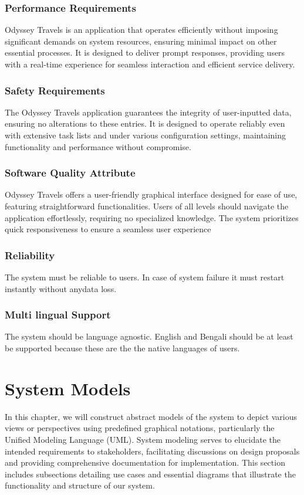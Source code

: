 \documentclass{scrreprt}
\begin{document}
\subsection{Performance Requirements}
Odyssey Travels is an application that operates efficiently without imposing significant demands on system resources, ensuring minimal impact on other essential processes. It is designed to deliver prompt responses, providing users with a real-time experience for seamless interaction and efficient service delivery.

\subsection {Safety Requirements}
The Odyssey Travels application guarantees the integrity of user-inputted data, ensuring no alterations to these entries. It is designed to operate reliably even with extensive task lists and under various configuration settings, maintaining functionality and performance without compromise.

\subsection {Software Quality Attribute}
Odyssey Travels offers a user-friendly graphical interface designed for ease of use, featuring straightforward functionalities. Users of all levels should navigate the application effortlessly, requiring no specialized knowledge. The system prioritizes quick responsiveness to ensure a seamless user experience
\subsection {Reliability}
The system must be reliable to users. In case of system failure it must restart instantly without anydata loss.
\subsection {Multi lingual Support}
The system should be language agnostic. English and Bengali should be at least be supported
because these are the the native languages of users.



\chapter{System Models}
In this chapter, we will construct abstract models of the system to depict various views or perspectives using predefined graphical notations, particularly the Unified Modeling Language (UML). System modeling serves to elucidate the intended requirements to stakeholders, facilitating discussions on design proposals and providing comprehensive documentation for implementation. This section includes subsections detailing use cases and essential diagrams that illustrate the functionality and structure of our system.
\end{document}
